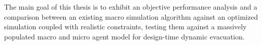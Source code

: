 The main goal of this thesis is to exhibit an objective performance analysis and a comparison between an existing macro simulation algorithm against an optimized simulation coupled with realistic constraints, testing them against a massively populated macro and micro agent model for design-time dynamic evacuation. 
